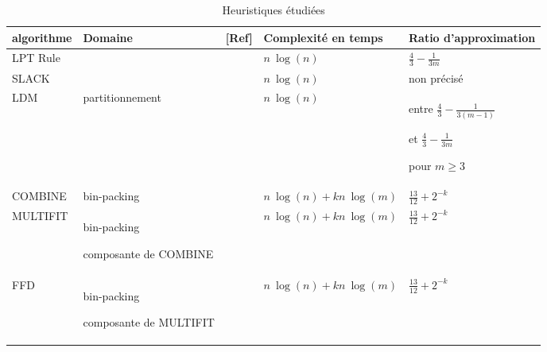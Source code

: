 \documentclass[a4paper,12pt]{report}
\theoremstyle{plain}				%
\theoremstyle{definition}				%
\begin{document}
\begin{table}[h] %
\centering
\begin{tabular}{p{3cm} p{3cm} p{1cm} p{4cm} p{4cm}}
\hline
algorithme 	& Domaine 
			& [Ref] 
			& Complexité en temps 
			& Ratio d'approximation\\
\hline

LPT Rule 	&  
			& \cite{graham1966bounds} 
			& $n~\log(n)$ 
			& $\frac{4}{3}-\frac{1}{3m}$ \\

SLACK   	& 
			& \cite{della2020longest} 
			&$n~\log(n)$ 
			& non précisé \\

LDM   		&  partitionnement 
			& \cite{karmarkar1982differencing} 
			& $n~\log(n)$ 
			& entre $ \frac{4}{3}-\frac{1}{3(m-1)}$
			
			  et    $\frac{4}{3}-\frac{1}{3 m}$
			  
			  pour $m\geq3$  \\

COMBINE 	& bin-packing 
			& \cite{lee1988multiprocessor} 
			& $ n~\log(n) + kn~\log(m)$ 
			& $\frac{13}{12} + 2^{-k}$ \\
\hline
MULTIFIT 	&	bin-packing
 
				composante de COMBINE
			& \cite{lee1988multiprocessor} 
			& $ n~\log(n) + kn~\log(m)$ 
			& $\frac{13}{12} + 2^{-k}$ \\
FFD 		& 	bin-packing
		
				composante de MULTIFIT 
			& \cite{lee1988multiprocessor} 
			& $ n~\log(n) + kn~\log(m)$ 
			& $\frac{13}{12} + 2^{-k}$ \\




\hline
\end{tabular}
\caption{Heuristiques étudiées}
\label{table:Heuritiques}
\end{table}


\end{document}
